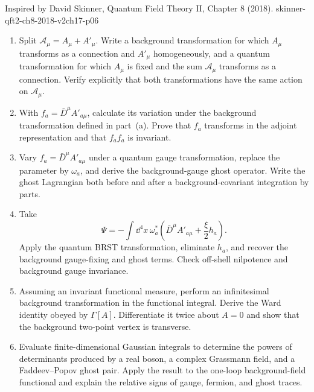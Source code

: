 \begin{enumerate}
  {Inspired by David Skinner, Quantum Field Theory II, Chapter 8 (2018).}
  {skinner-qft2-ch8-2018-v2ch17-p06}
  \begin{enumerate}
    \item[(a)]
    Split \(\mathcal A_\mu=A_\mu+A'_\mu\).  Write a background
    transformation for which \(A_\mu\) transforms as a connection and
    \(A'_\mu\) homogeneously, and a quantum transformation for which \(A_\mu\)
    is fixed and the sum \(\mathcal A_\mu\) transforms as a connection.
    Verify explicitly that both transformations have the same action on
    \(\mathcal A_\mu\).
    \item[(b)]
    With \(f_a=\bar D^\mu A'_{a\mu}\), calculate its variation
    under the background transformation defined in part~(a).  Prove
    that \(f_a\) transforms in the adjoint representation and that
    \(f_a f_a\) is invariant.
    \item[(c)]
    Vary \(f_a=\bar D^\mu A'_{a\mu}\) under a quantum gauge
    transformation, replace the parameter by \(\omega_a\), and derive
    the background-gauge ghost operator.  Write the ghost Lagrangian both
    before and after a background-covariant integration by parts.
    \item[(d)]
    Take
    \[
      \Psi=-\int \dd^4x\,\omega_a^*
        \left(\bar D^\mu A'_{a\mu}+\frac{\xi}{2}h_a\right).
    \]
    Apply the quantum BRST transformation, eliminate \(h_a\), and
    recover the background gauge-fixing and ghost terms.  Check off-shell
    nilpotence and background gauge invariance.
    \item[(e)]
    Assuming an invariant functional measure, perform an infinitesimal
    background transformation in the functional integral.  Derive the Ward
    identity obeyed by \(\Gamma[A]\).  Differentiate it twice about
    \(A=0\) and show that the background two-point vertex is transverse.
    \item[(f)]
    Evaluate finite-dimensional Gaussian integrals to determine the powers
    of determinants produced by a real boson, a complex Grassmann field,
    and a Faddeev--Popov ghost pair.  Apply the result to the one-loop
    background-field functional and explain the relative signs of gauge,
    fermion, and ghost traces.
  \end{enumerate}


\end{enumerate}

